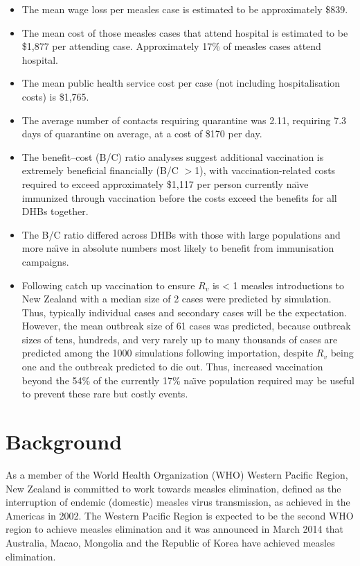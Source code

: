 \documentclass{article}
\begin{document}
\begin{itemize}
\item The mean wage loss per measles case is estimated to be approximately \$839.
\item The mean cost of those measles cases that attend hospital is estimated to be \$1,877 per attending case. Approximately 17\% of measles cases attend hospital.
\item The mean public health service cost per case (not including hospitalisation costs) is \$1,765.
\item The average number of contacts requiring quarantine was 2.11, requiring 7.3 days of quarantine on average, at a cost of \$170 per day.
\item The benefit--cost (B/C) ratio analyses suggest additional vaccination is extremely beneficial financially (B/C $>$1), with vaccination-related costs required to exceed approximately \$1,117 per person currently na\"{\i}ve immunized through vaccination before the costs exceed the benefits for all DHBs together.
\item The B/C ratio differed across DHBs with those with large populations and more na\"{\i}ve in absolute numbers most likely to benefit from immunisation campaigns. 
\item Following catch up vaccination to ensure $R_v$ is < 1 measles introductions to New Zealand with a median size of 2 cases were predicted by simulation. Thus, typically individual cases and secondary cases will be the expectation. However, the mean outbreak size of 61 cases was predicted, because outbreak sizes of tens, hundreds, and very rarely up to many thousands of cases are predicted among the 1000 simulations following importation, despite $R_v$ being one and the outbreak predicted to die out. Thus, increased vaccination beyond the 54\% of the currently 17\% na\"{\i}ve population required may be useful to prevent these rare but costly events.
\end{itemize}

\section{Background}

As a member of the World Health Organization (WHO) Western Pacific Region, New Zealand is committed to work towards measles elimination, defined as the interruption of endemic (domestic) measles virus transmission, as achieved in the Americas in 2002. The Western Pacific Region is expected to be the second WHO region to  achieve measles elimination and it was announced in March 2014 that Australia, Macao, Mongolia and the Republic of Korea have achieved measles elimination.
\end{document}
